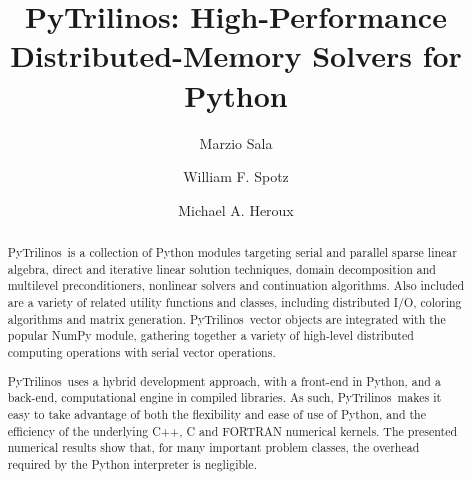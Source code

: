 \documentclass{llncs}
\newcommand{\PyTrilinos}{{\sc PyTrilinos}}
\begin{document}
\pagestyle{headings}
\mainmatter              %

\title{\PyTrilinos: High-Performance Distributed-Memory Solvers for
       Python}

\author{Marzio Sala \and William F. Spotz \and
  Michael A. Heroux}

%
%

\maketitle              %

\begin{abstract}
\PyTrilinos\ is a collection of Python modules targeting serial
and parallel sparse linear algebra, direct and iterative linear
solution techniques, domain decomposition and multilevel
preconditioners, nonlinear solvers and continuation algorithms. Also
included are a variety of related utility functions and classes,
including distributed I/O, coloring algorithms and matrix
generation. \PyTrilinos\ vector objects are integrated with the
popular NumPy module, gathering together a variety of
high-level distributed computing operations with serial vector
operations.

\PyTrilinos\ uses a hybrid development approach, with a front-end in Python,
and a back-end, computational engine in compiled libraries. As such,
\PyTrilinos\ makes it easy to
take advantage of both the flexibility and ease of use of Python, and the
efficiency of the underlying C++, C and FORTRAN numerical kernels.  The
presented numerical results show that, for many important problem classes, the
overhead required by the Python interpreter is negligible.
\end{abstract}
\end{document}
